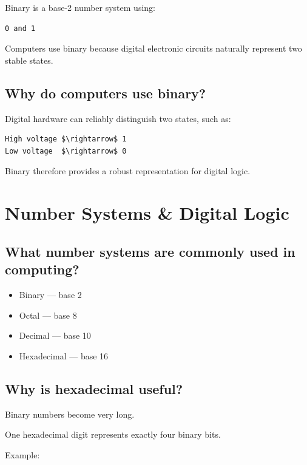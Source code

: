 Binary is a base-2 number system using:

\begin{lstlisting}
0 and 1
\end{lstlisting}

Computers use binary because digital electronic circuits naturally represent two stable states.

\medskip

\subsection{Why do computers use binary?}

Digital hardware can reliably distinguish two states, such as:

\begin{lstlisting}
High voltage $\rightarrow$ 1
Low voltage  $\rightarrow$ 0
\end{lstlisting}

Binary therefore provides a robust representation for digital logic.

\medskip

\section{Number Systems \& Digital Logic}

\subsection{What number systems are commonly used in computing?}

\begin{itemize}
  \item Binary --- base 2
  \item Octal --- base 8
  \item Decimal --- base 10
  \item Hexadecimal --- base 16
\end{itemize}

\medskip

\subsection{Why is hexadecimal useful?}

Binary numbers become very long.

One hexadecimal digit represents exactly four binary bits.

Example:

